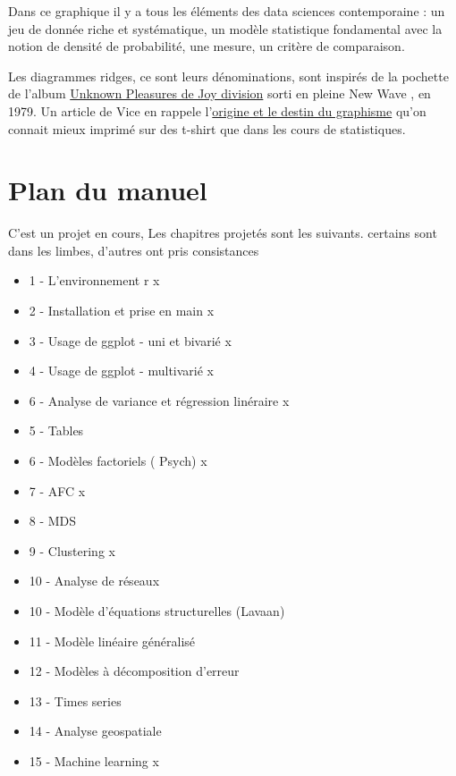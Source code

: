 \documentclass[
]{book}
\providecommand{\tightlist}{%
  \setlength{\itemsep}{0pt}\setlength{\parskip}{0pt}}
\begin{document}
Dans ce graphique il y a tous les éléments des data sciences contemporaine : un jeu de donnée riche et systématique, un modèle statistique fondamental avec la notion de densité de probabilité, une mesure, un critère de comparaison.

Les diagrammes ridges, ce sont leurs dénominations, sont inspirés de la pochette de l'album \href{https://www.youtube.com/watch?v=7PtvIr2oiaE}{Unknown Pleasures de Joy division} sorti en pleine New Wave , en 1979. Un article de Vice en rappele l'\href{https://i-d.vice.com/fr/article/pabjam/pourquoi-cette-pochette-dalbum-de-joy-division-a-inspire-le-monde-entier}{origine et le destin du graphisme} qu'on connait mieux imprimé sur des t-shirt que dans les cours de statistiques.

\hypertarget{plan-du-manuel}{%
\section{Plan du manuel}\label{plan-du-manuel}}

C'est un projet en cours, Les chapitres projetés sont les suivants. certains sont dans les limbes, d'autres ont pris consistances

\begin{itemize}
\tightlist
\item
  1 - L'environnement r x
\item
  2 - Installation et prise en main x
\item
  3 - Usage de ggplot - uni et bivarié x
\item
  4 - Usage de ggplot - multivarié x
\item
  6 - Analyse de variance et régression linéraire x
\item
  5 - Tables
\item
  6 - Modèles factoriels ( Psych) x
\item
  7 - AFC x
\item
  8 - MDS\\
\item
  9 - Clustering x
\item
  10 - Analyse de réseaux
\item
  10 - Modèle d'équations structurelles (Lavaan)
\item
  11 - Modèle linéaire généralisé
\item
  12 - Modèles à décomposition d'erreur
\item
  13 - Times series
\item
  14 - Analyse geospatiale
\item
  15 - Machine learning x
\end{itemize}
\end{document}
